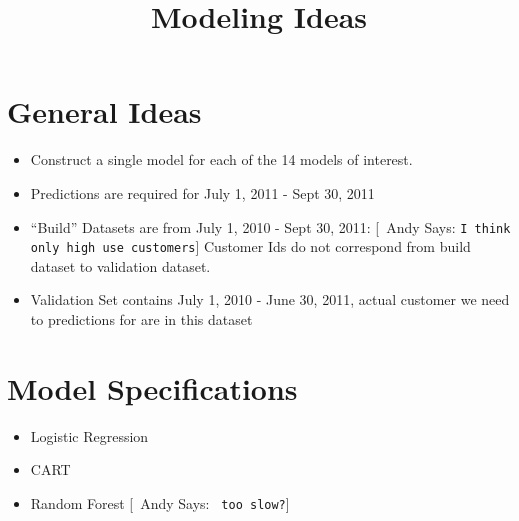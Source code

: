 \documentclass{article}
\begin{document}
  \title{\bf Modeling Ideas}
  
 \maketitle
\newcommand{\ac}[1]{[{\color{red}\ Andy Says: {\tt #1}}]}

\section{General Ideas}

\begin{itemize}
\item Construct a single model for each of the 14 models of interest.
\item Predictions are required for July 1, 2011 - Sept 30, 2011
\item ``Build'' Datasets are from July 1, 2010 - Sept 30, 2011:  \ac{I think only high use customers}  Customer Ids do not correspond from build dataset to validation dataset.
\item Validation Set contains July 1, 2010 - June 30, 2011, actual customer we need to predictions for are in this dataset
\end{itemize}

\section{Model Specifications}
\begin{itemize}
\item Logistic Regression
\item CART
\item Random Forest \ac{ too slow?}
\end{itemize}
\end{document}
